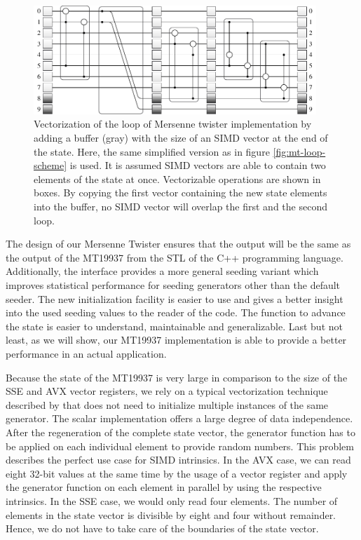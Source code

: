 \documentclass{stdlocal}
\begin{document}
    \begin{figure}
      \center
      \includegraphics[width=0.95\textwidth]{figures/mt19937_vector_loop_scheme.pdf}
      \caption[Mersenne Twister Vector Loop Scheme]{
        Vectorization of the loop of Mersenne twister implementation by adding a buffer (gray) with the size of an SIMD vector at the end of the state.
        Here, the same simplified version as in figure \ref{fig:mt-loop-scheme} is used.
        It is assumed SIMD vectors are able to contain two elements of the state at once.
        Vectorizable operations are shown in boxes.
        By copying the first vector containing the new state elements into the buffer, no SIMD vector will overlap the first and the second loop.
      }
      \label{fig:mt-vector-loop-scheme}
    \end{figure}

    The design of our Mersenne Twister ensures that the output will be the same as the output of the MT19937 from the STL of the C++ programming language.
    Additionally, the interface provides a more general seeding variant which improves statistical performance for seeding generators other than the default seeder.
    The new initialization facility is easier to use and gives a better {}insight into the used seeding values to the reader of the code.
    The function to advance the state is easier to understand, maintainable and generalizable.
    Last but not least, as we will show, our MT19937 implementation is able to provide a better performance in an actual application.

    Because the state of the MT19937 is very large in comparison to the size of the SSE and AVX vector registers, we rely on a typical vectorization technique described by \textcite{fog2015} that does not need to initialize multiple instances of the same generator.
    The scalar implementation offers a large degree of data independence.
    After the regeneration of the complete state vector, the generator function has to be applied on each individual element to provide random numbers.
    This problem describes the perfect use case for SIMD intrinsics.
    In the AVX case, we can read eight 32-bit values at the same time by the usage of a vector register and apply the generator function on each element in parallel by using the respective intrinsics.
    In the SSE case, we would only read four elements.
    The number of elements in the state vector is divisible by eight and four without remainder.
    Hence, we do not have to take care of the boundaries of the state vector.
\end{document}
